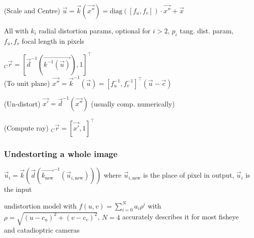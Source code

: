 (Scale and Centre) $\vec{u} = \vec{k}(\vec{x''}) = \text{diag}([f_u, f_v]) \cdot \vec{x''} + \vec{x}$

All with $k_i$ radial distortion params, optional for $i > 2$, $p_i$ tang. dist. param, $f_u, f_v$ focal length in pixels

 ${_C}\vec{r} = [\vec{d}^{-1}(\vec{k^{-1}(\vec{u})}), 1]^\top$\\
(To unit plane)
$\vec{x''} = \vec{k}^{-1}(\vec{u}) = [f_u^{-1}, f_v^{-1}]^\top (\vec{u} - \vec{c})$

(Un-distort)
$\vec{x'} = \vec{d}^{-1}(\vec{x''})$ (usually comp. numerically)

(Compute ray)
${_C}\vec{r} = [\vec{x'}, 1]^\top$


\subsubsection{Undestorting a whole image}
$\vec{u}_i = \vec{k}(\vec{d}(\vec{k_{\text{new}}}^{-1}(\vec{u}_{i, \text{new}})))$
where $\vec{u}_{i, \text{new}}$ is the place of pixel in output, $\vec{u}_i$ is the input

 undistortion model with $f(u, v) = \sum_{i = 0}^{N} a_i \rho^i$
with $\rho = \sqrt{(u - c_u)^2 + (v - c_v)^2}$, $N = 4$ accurately describes it for most fisheye and catadioptric cameras
